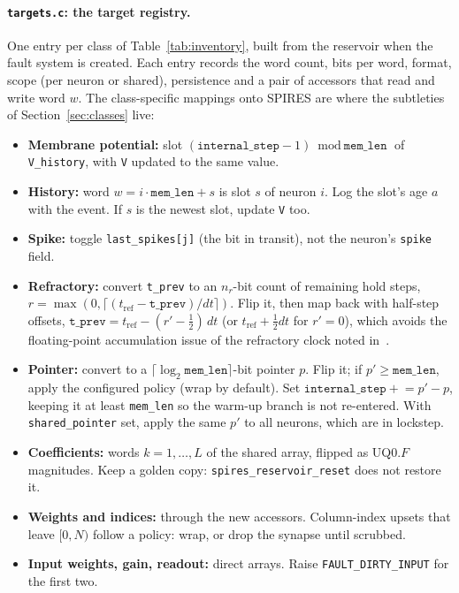 \documentclass[11pt,a4paper]{article}
\begin{document}
\paragraph{\texttt{targets.c}: the target registry.} One entry per class of Table~\ref{tab:inventory}, built from the reservoir when the fault system is created. Each entry records the word count, bits per word, format, scope (per neuron or shared), persistence and a pair of accessors that read and write word $w$. The class-specific mappings onto SPIRES are where the subtleties of Section~\ref{sec:classes} live:
\begin{itemize}
  \item \textbf{Membrane potential:} slot $(\texttt{internal\_step}-1) \bmod \texttt{mem\_len}$ of \texttt{V\_history}, with \texttt{V} updated to the same value.
  \item \textbf{History:} word $w = i \cdot \texttt{mem\_len} + s$ is slot $s$ of neuron $i$. Log the slot's age $a$ with the event. If $s$ is the newest slot, update \texttt{V} too.
  \item \textbf{Spike:} toggle \texttt{last\_spikes[j]} (the bit in transit), not the neuron's \texttt{spike} field.
  \item \textbf{Refractory:} convert \texttt{t\_prev} to an $n_r$-bit count of remaining hold steps, $r = \max(0, \lceil (t_{\mathrm{ref}} - \texttt{t\_prev})/dt \rceil)$. Flip it, then map back with half-step offsets, $\texttt{t\_prev} = t_{\mathrm{ref}} - (r' - \tfrac12)\,dt$ (or $t_{\mathrm{ref}} + \tfrac12 dt$ for $r' = 0$), which avoids the floating-point accumulation issue of the refractory clock noted in~\cite{dropout2026}.
  \item \textbf{Pointer:} convert to a $\lceil\log_2 \texttt{mem\_len}\rceil$-bit pointer $p$. Flip it; if $p' \ge \texttt{mem\_len}$, apply the configured policy (wrap by default). Set $\texttt{internal\_step} \mathrel{+}= p' - p$, keeping it at least \texttt{mem\_len} so the warm-up branch is not re-entered. With \texttt{shared\_pointer} set, apply the same $p'$ to all neurons, which are in lockstep.
  \item \textbf{Coefficients:} words $k = 1,\dots,L$ of the shared array, flipped as UQ0.$F$ magnitudes. Keep a golden copy: \texttt{spires\_reservoir\_reset} does not restore it.
  \item \textbf{Weights and indices:} through the new accessors. Column-index upsets that leave $[0, N)$ follow a policy: wrap, or drop the synapse until scrubbed.
  \item \textbf{Input weights, gain, readout:} direct arrays. Raise \texttt{FAULT\_DIRTY\_INPUT} for the first two.
\end{itemize}
\end{document}
